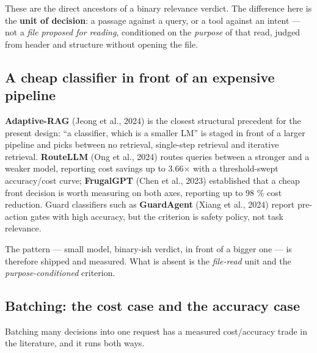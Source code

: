 \documentclass[10pt]{article}
\begin{document}
These are the direct ancestors of a binary relevance verdict. The difference here is the \textbf{unit of decision}: a passage against a query, or a tool against an intent --- not a \emph{file proposed for reading}, conditioned on the \emph{purpose} of that read, judged from header and structure without opening the file.

\subsection{A cheap classifier in front of an expensive pipeline}

\textbf{Adaptive-RAG} (Jeong et al., 2024)\cite{ref4} is the closest structural precedent for the present design: ``a classifier, which is a smaller LM'' is staged in front of a larger pipeline and picks between no retrieval, single-step retrieval and iterative retrieval. \textbf{RouteLLM} (Ong et al., 2024)\cite{ref8} routes queries between a stronger and a weaker model, reporting cost savings up to 3.66$\times$ with a threshold-swept accuracy/cost curve; \textbf{FrugalGPT} (Chen et al., 2023)\cite{ref2} established that a cheap front decision is worth measuring on both axes, reporting up to 98 \% cost reduction. Guard classifiers such as \textbf{GuardAgent} (Xiang et al., 2024)\cite{ref12} report pre-action gates with high accuracy, but the criterion is safety policy, not task relevance.

The pattern --- small model, binary-ish verdict, in front of a bigger one --- is therefore shipped and measured. What is absent is the \emph{file-read} unit and the \emph{purpose-conditioned} criterion.

\subsection{Batching: the cost case and the accuracy case}

Batching many decisions into one request has a measured cost/accuracy trade in the literature, and it runs both ways.
\end{document}
